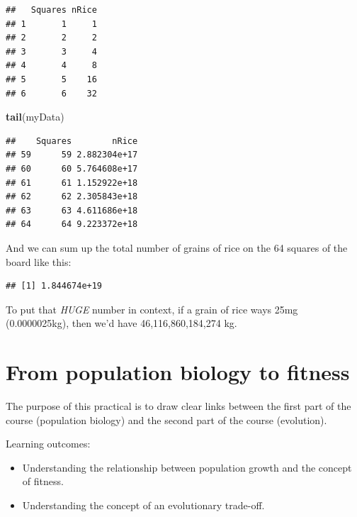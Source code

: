 \documentclass[
  a4paper]{book}
\newenvironment{Shaded}{\begin{snugshade}}{\end{snugshade}}
\newcommand{\FunctionTok}[1]{\textcolor[rgb]{0.13,0.29,0.53}{\textbf{#1}}}
\newcommand{\NormalTok}[1]{#1}
\newcommand{\SpecialCharTok}[1]{\textcolor[rgb]{0.81,0.36,0.00}{\textbf{#1}}}
\providecommand{\tightlist}{%
  \setlength{\itemsep}{0pt}\setlength{\parskip}{0pt}}
\begin{document}
\begin{verbatim}
##   Squares nRice
## 1       1     1
## 2       2     2
## 3       3     4
## 4       4     8
## 5       5    16
## 6       6    32
\end{verbatim}

\begin{Shaded}
\begin{Highlighting}[]
\FunctionTok{tail}\NormalTok{(myData)}
\end{Highlighting}
\end{Shaded}

\begin{verbatim}
##    Squares        nRice
## 59      59 2.882304e+17
## 60      60 5.764608e+17
## 61      61 1.152922e+18
## 62      62 2.305843e+18
## 63      63 4.611686e+18
## 64      64 9.223372e+18
\end{verbatim}

And we can sum up the total number of grains of rice on the 64 squares of the board like this:

\begin{Shaded}
\end{Shaded}

\begin{verbatim}
## [1] 1.844674e+19
\end{verbatim}

To put that \emph{HUGE} number in context, if a grain of rice ways 25mg (0.0000025kg), then we'd have 46,116,860,184,274 kg.

\hypertarget{from-population-biology-to-fitness}{%
\chapter{From population biology to fitness}\label{from-population-biology-to-fitness}}

The purpose of this practical is to draw clear links between the first part of the course (population biology) and the second part of the course (evolution).

\begin{do-something}
Learning outcomes:

\begin{itemize}
\tightlist
\item
  Understanding the relationship between population growth and the
  concept of fitness.
\item
  Understanding the concept of an evolutionary trade-off.
\end{itemize}
\end{do-something}
\end{document}

